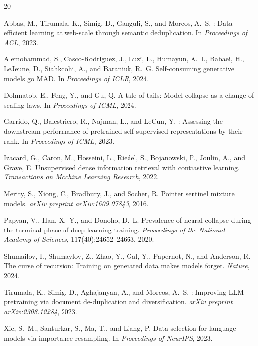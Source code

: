 \documentclass[11pt,a4paper]{article}
\begin{document}
\begin{thebibliography}{20}

Abbas, M., Tirumala, K., Simig, D., Ganguli, S., and Morcos, A.~S.
: Data-efficient learning at web-scale through semantic deduplication.
\newblock In \emph{Proceedings of ACL}, 2023.

Alemohammad, S., Casco-Rodriguez, J., Luzi, L., Humayun, A.~I., Babaei, H., LeJeune, D., Siahkoohi, A., and Baraniuk, R.~G.
\newblock Self-consuming generative models go {MAD}.
\newblock In \emph{Proceedings of ICLR}, 2024.

Dohmatob, E., Feng, Y., and Gu, Q.
\newblock A tale of tails: Model collapse as a change of scaling laws.
\newblock In \emph{Proceedings of ICML}, 2024.

Garrido, Q., Balestriero, R., Najman, L., and LeCun, Y.
: Assessing the downstream performance of pretrained self-supervised representations by their rank.
\newblock In \emph{Proceedings of ICML}, 2023.

Izacard, G., Caron, M., Hosseini, L., Riedel, S., Bojanowski, P., Joulin, A., and Grave, E.
\newblock Unsupervised dense information retrieval with contrastive learning.
\newblock \emph{Transactions on Machine Learning Research}, 2022.

Merity, S., Xiong, C., Bradbury, J., and Socher, R.
\newblock Pointer sentinel mixture models.
\newblock \emph{arXiv preprint arXiv:1609.07843}, 2016.

Papyan, V., Han, X.~Y., and Donoho, D.~L.
\newblock Prevalence of neural collapse during the terminal phase of deep learning training.
\newblock \emph{Proceedings of the National Academy of Sciences}, 117(40):24652--24663, 2020.

Shumailov, I., Shumaylov, Z., Zhao, Y., Gal, Y., Papernot, N., and Anderson, R.
\newblock The curse of recursion: Training on generated data makes models forget.
\newblock \emph{Nature}, 2024.

Tirumala, K., Simig, D., Aghajanyan, A., and Morcos, A.~S.
: Improving {LLM} pretraining via document de-duplication and diversification.
\newblock \emph{arXiv preprint arXiv:2308.12284}, 2023.

Xie, S.~M., Santurkar, S., Ma, T., and Liang, P.
\newblock Data selection for language models via importance resampling.
\newblock In \emph{Proceedings of NeurIPS}, 2023.

\end{thebibliography}
\end{document}
